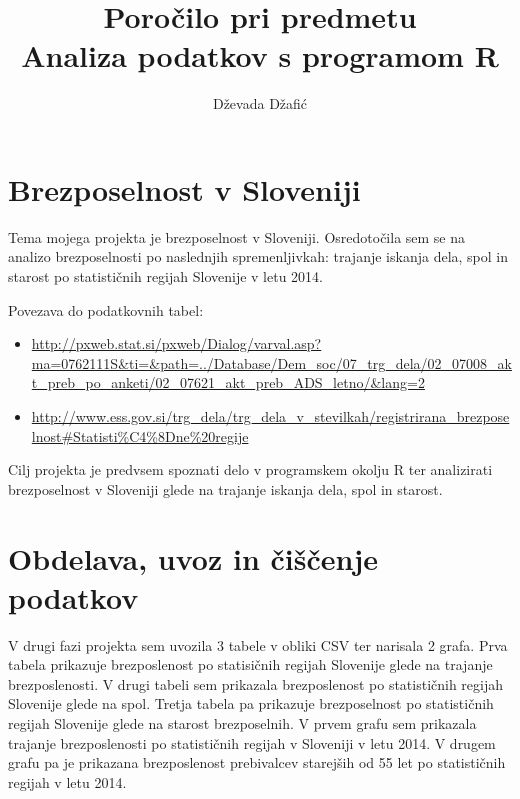 \documentclass[11pt,a4paper]{article}
\begin{document}
\title{Poročilo pri predmetu \\
Analiza podatkov s programom R}
\author{Dževada Džafić}
\maketitle

\section{Brezposelnost v Sloveniji}

Tema mojega projekta je brezposelnost v Sloveniji. Osredotočila sem se na analizo brezposelnosti po naslednjih spremenljivkah: trajanje iskanja dela, spol in starost po statističnih regijah Slovenije v letu 2014.

Povezava do podatkovnih tabel:
\begin{itemize}

\item \url{http://pxweb.stat.si/pxweb/Dialog/varval.asp?ma=0762111S&ti=&path=../Database/Dem_soc/07_trg_dela/02_07008_akt_preb_po_anketi/02_07621_akt_preb_ADS_letno/&lang=2}
\item \url{http://www.ess.gov.si/trg_dela/trg_dela_v_stevilkah/registrirana_brezposelnost#Statisti%C4%8Dne%20regije}

\end{itemize}

Cilj projekta je predvsem spoznati delo v programskem okolju R ter analizirati brezposelnost v Sloveniji glede na trajanje iskanja dela, spol in starost.


\section{Obdelava, uvoz in čiščenje podatkov}

V drugi fazi projekta sem uvozila 3 tabele v obliki CSV ter narisala 2 grafa.
Prva tabela prikazuje brezposlenost po statisičnih regijah Slovenije glede na trajanje brezposlenosti.
V drugi tabeli sem prikazala brezposlenost po statističnih regijah Slovenije glede na spol. Tretja tabela pa prikazuje brezposelnost po statističnih regijah Slovenije glede na starost brezposelnih.
V prvem grafu sem prikazala trajanje brezposlenosti po statističnih regijah v Sloveniji v letu 2014. V drugem grafu pa je prikazana brezposlenost prebivalcev starejših od 55 let po statističnih regijah v letu 2014.

\end{document}
